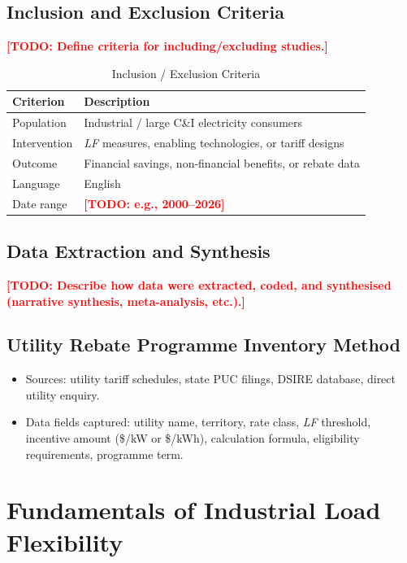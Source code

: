 \documentclass[12pt, a4paper, twocolumn]{article}
\newcommand{\LF}{\textit{LF}}
\newcommand{\TODO}[1]{\textcolor{red}{\textbf{[TODO: #1]}}}
\begin{document}
\subsection{Inclusion and Exclusion Criteria}
\TODO{Define criteria for including/excluding studies.}

\begin{table}[H]
\centering
\caption{Inclusion / Exclusion Criteria}
\label{tab:criteria}
\begin{tabularx}{\columnwidth}{lX}
\toprule
\textbf{Criterion} & \textbf{Description} \\
\midrule
Population   & Industrial / large C\&I electricity consumers \\
Intervention & \LF{} measures, enabling technologies, or tariff designs \\
Outcome      & Financial savings, non-financial benefits, or rebate data \\
Language     & English \\
Date range   & \TODO{e.g., 2000--2026} \\
\bottomrule
\end{tabularx}
\end{table}

\subsection{Data Extraction and Synthesis}
\TODO{Describe how data were extracted, coded, and synthesised (narrative synthesis, meta-analysis, etc.).}

\subsection{Utility Rebate Programme Inventory Method}
\begin{itemize}[nosep]
  \item Sources: utility tariff schedules, state PUC filings, DSIRE database, direct utility enquiry.
  \item Data fields captured: utility name, territory, rate class, \LF{} threshold, incentive amount (\$/kW or \$/kWh), calculation formula, eligibility requirements, programme term.
\end{itemize}


\section{Fundamentals of Industrial Load Flexibility}
\label{sec:fundamentals}
\end{document}
